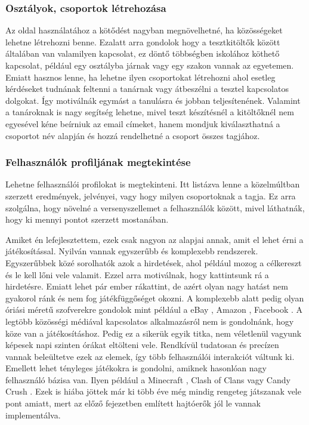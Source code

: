 \subsubsection{Osztályok, csoportok létrehozása}
Az oldal használatához a kötődést nagyban megnövelhetné, ha közösségeket lehetne létrehozni benne. Ezalatt arra gondolok hogy a tesztkitöltők között általában van valamilyen kapcsolat, ez döntő többségben iskolához köthető kapcsolat, például egy osztályba járnak vagy egy szakon vannak az egyetemen. Emiatt hasznos lenne, ha lehetne ilyen csoportokat létrehozni ahol esetleg kérdéseket tudnának feltenni a tanárnak vagy átbeszélni a tesztel kapcsolatos dolgokat. Így motiválnák egymást a tanulásra és jobban teljesítenének. Valamint a tanároknak is nagy segítség lehetne, mivel teszt készítésnél a kitöltőknél nem egyesével kéne beírniuk az email címeket, hanem mondjuk kiválaszthatná a csoportot név alapján és hozzá rendelhetné a csoport összes tagjához.

\subsubsection{Felhasználók profiljának megtekintése}
Lehetne felhasználói profilokat is megtekinteni. Itt listázva lenne a közelmúltban szerzett eredmények, jelvényei, vagy hogy milyen csoportoknak a tagja. Ez arra szolgálna, hogy növelné a versenyszellemet a felhasználók között, mivel láthatnák, hogy ki mennyi pontot szerzett mostanában.


Amiket én lefejlesztettem, ezek csak nagyon az alapjai annak, amit el lehet érni a játékosítással. Nyilván vannak egyszerűbb és komplexebb rendszerek. Egyszerűbbek közé sorolhatók azok a hirdetések, ahol például mozog a célkereszt és le kell lőni vele valamit. Ezzel arra motiválnak, hogy kattintsunk rá a hirdetésre. Emiatt lehet pár ember rákattint, de azért olyan nagy hatást nem gyakorol ránk és nem fog játékfüggőséget okozni. A komplexebb alatt pedig olyan óriási méretű szofverekre gondolok mint például a eBay \cite{ebay}, Amazon \cite{amazon}, Facebook \cite{facebook}. A legtöbb közösségi médiával kapcsolatos alkalmazásról nem is gondolnánk, hogy köze van a játékosításhoz. Pedig ez a sikerük egyik titka, nem véletlenül vagyunk képesek napi szinten órákat eltölteni vele. Rendkívül tudatosan és precízen vannak beleültetve ezek az elemek, így több felhasználói interakciót váltunk ki. Emellett lehet tényleges játékokra is gondolni, amiknek hasonlóan nagy felhasználó bázisa van. Ilyen például a Minecraft \cite{minecraft}, Clash of Clans \cite{clashOfClans} vagy Candy Crush \cite{candycrush}. Ezek is hiába jöttek már ki több éve még mindig rengeteg játszanak vele pont amiatt, mert az előző fejezetben említett hajtóerők jól le vannak implementálva. \newline

